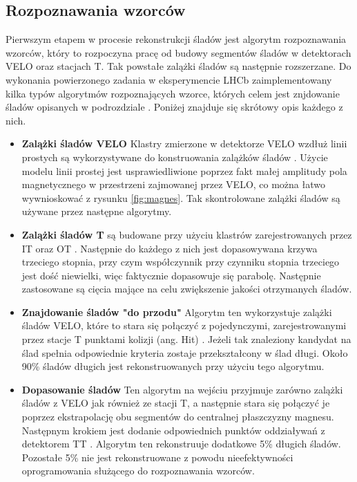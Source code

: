 \subsection{Rozpoznawania wzorców}
Pierwszym etapem w procesie rekonstrukcji śladów jest algorytm rozpoznawania wzorców, który to rozpoczyna pracę od budowy segmentów śladów w detektorach VELO oraz stacjach T. Tak powstałe zalążki śladów są następnie rozszerzane. Do wykonania powierzonego zadania w eksperymencie LHCb zaimplementowany kilka typów algorytmów rozpoznających wzorce, których celem jest znjdowanie śladów opisanych w podrozdziale \label{typySladow}. Poniżej znajduje się skrótowy opis każdego z nich. 

\begin{itemize}
\item \textbf{Zalążki śladów VELO} Klastry zmierzone w  detektorze VELO wzdłuż linii prostych są wykorzystywane do konstruowania zalążków śladów \cite{VeloPattern}. Użycie modelu linii prostej jest usprawiedliwione poprzez fakt małej amplitudy pola magnetycznego w przestrzeni zajmowanej przez VELO, co można łatwo wywnioskować z rysunku \ref{fig:magnes}. Tak skontrolowane zalążki śladów są używane przez następne algorytmy. 
\item \textbf{Zalążki śladów T} są budowane przy użyciu klastrów zarejestrowanych przez IT oraz OT \cite{TPattern}. Następnie do każdego z nich jest dopasowywana krzywa trzeciego stopnia, przy czym współczynnik przy czynniku stopnia trzeciego jest dość niewielki, więc faktycznie dopasowuje się parabolę. Następnie zastosowane są cięcia mające na celu zwiększenie jakości otrzymanych śladów.
\item \textbf{Znajdowanie śladów "do przodu"}  Algorytm ten wykorzystuje zalążki śladów VELO, które to stara się połączyć z pojedynczymi, zarejestrowanymi przez stacje T punktami kolizji (ang. Hit) \cite{ForwardTracking}. Jeżeli tak znaleziony kandydat na ślad spełnia odpowiednie kryteria zostaje przekształcony w ślad długi. Około 90\% śladów długich jest rekonstruowanych przy użyciu tego algorytmu. 
\item \textbf{Dopasowanie śladów} 
Ten algorytm na wejściu przyjmuje zarówno zalążki śladów z VELO jak również ze stacji T, a następnie stara się połączyć je poprzez ekstrapolację obu segmentów do centralnej płaszczyzny magnesu. Następnym krokiem jest dodanie odpowiednich punktów oddziaływań z detektorem TT \cite{TrackMatching}. Algorytm ten rekonstruuje dodatkowe 5\% długich śladów. Pozostałe 5\% nie jest rekonstruowane z powodu nieefektywności oprogramowania służącego do rozpoznawania wzorców.  

\end{itemize}
